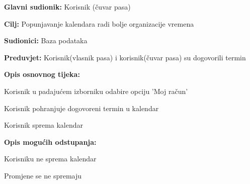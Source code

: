 					\noindent {}	
					\begin{packed_item}
						
						\item \textbf{Glavni sudionik: } Korisnik (čuvar pasa)
						\item  \textbf{Cilj:} Popunjavanje kalendara radi bolje organizacije vremena
						\item  \textbf{Sudionici:} Baza podataka
						\item  \textbf{Preduvjet:} Korisnik(vlasnik pasa) i korisnik(čuvar pasa) su dogovorili termin 
						\item  \textbf{Opis osnovnog tijeka:}
						
						\item[] \begin{packed_enum}
							
							\item Korisnik u padajućem izborniku odabire opciju 'Moj račun'   
							\item Korisnik pohranjuje dogovoreni termin u kalendar
							\item Korisnik sprema kalendar
							
						\end{packed_enum}
						
						\item  \textbf{Opis mogućih odstupanja:}
						
						\item[] \begin{packed_item}
							
							\item[3.a] Korisniku ne sprema kalendar
							\item[] \begin{packed_enum}
								
								\item Promjene se ne spremaju
								
							\end{packed_enum}
							
						\end{packed_item}
					\end{packed_item}	
					
